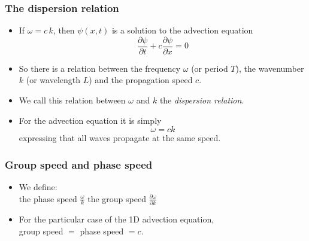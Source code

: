 \documentclass[aspectratio=43,9pt]{beamer}
\begin{document}
%
%
\begin{frame}
	\frametitle{The dispersion relation}
	\vfill\begin{itemize}
		\item If $\omega=c\,k$,	then $\psi(x,t)$ is a solution to the advection equation
			\begin{equation*}
				\frac{\partial \psi}{\partial t}+c\frac{\partial \psi}{\partial x}=0
			\end{equation*}\vfill
		\item So there is a relation between the frequency $\omega$ (or period $T$), the wavenumber $k$ (or wavelength $L$) and the propagation speed $c$.\vfill
		\item We call this relation between $\omega$ and $k$ the \emph{dispersion relation}.\vfill
		\item For the advection equation it is simply
			\begin{equation*}
				\omega = c k
			\end{equation*}
			expressing that all waves propagate at the same speed.
	\end{itemize}\vfill
\end{frame}
%
%
\begin{frame}
	\frametitle{Group speed and phase speed}
	\vfill\begin{itemize}
		\item We define:\\[2ex]
			\qquad the phase speed $\displaystyle\frac{\omega}k$
			\qquad the group speed $\displaystyle\frac{\partial \omega}{\partial k}$\vfill
		\item For the particular case of the 1D advection equation,\\[2ex]
			group speed $=$ phase speed $=c$.\vfill
	\end{itemize}\vfill
\end{frame}
%
%
\end{document}
